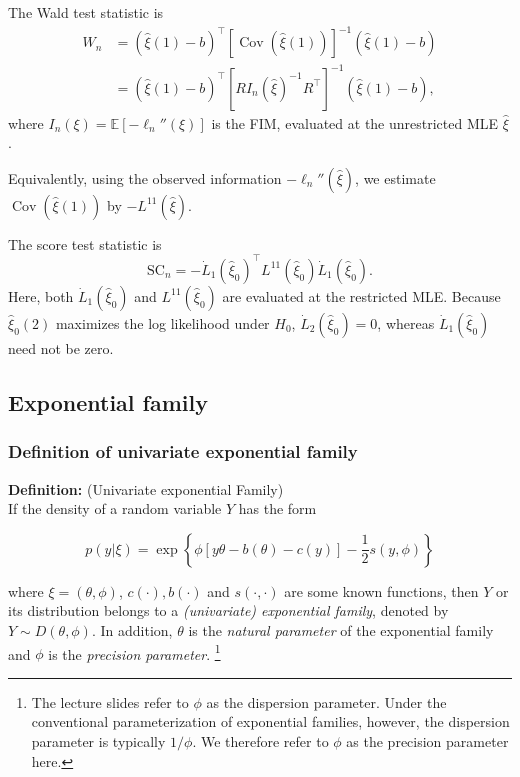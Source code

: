 \documentclass{article}
\newenvironment{mybox}{%
  \par\addvspace{10pt}%
  \begin{mdframed}[skipabove=0pt,skipbelow=10pt]%
}{%
  \end{mdframed}%
}
\theoremstyle{break}
\newcommand{\E}{\ensuremath{\mathbb{E}}}
\DeclareMathOperator{\Cov}{Cov}
\begin{document}
The Wald test statistic is
\begin{align*}
  W_n &= (\hat{\xi}(1) - b)^\top [\Cov(\hat{\xi}(1))]^{-1} (\hat{\xi}(1) - b) \\
    &= (\hat{\xi}(1) - b)^\top [R I_n(\hat{\xi})^{-1} R^\top]^{-1} (\hat{\xi}(1) - b),
\end{align*}
where $I_n(\xi)=\E[-\ell_n''(\xi)]$ is the FIM, evaluated at the unrestricted MLE $\hat{\xi}$.

Equivalently, using the observed information $-\ell_n''(\hat{\xi})$, we estimate $\Cov(\hat{\xi}(1))$ by $-L^{11}(\hat{\xi})$.

The score test statistic is
\begin{equation*}
  \text{SC}_n = -\dot{L}_1(\hat{\xi}_0)^\top L^{11}(\hat{\xi}_0) \dot{L}_1(\hat{\xi}_0).
\end{equation*}
Here, both $\dot{L}_1(\hat{\xi}_0)$ and $L^{11}(\hat{\xi}_0)$ are evaluated at the restricted MLE. Because $\hat{\xi}_0(2)$ maximizes the log likelihood under $H_0$, $\dot{L}_2(\hat{\xi}_0)=0$, whereas $\dot{L}_1(\hat{\xi}_0)$ need not be zero.


\subsection{Exponential family}\label{sec:prelim-glm-exp-family}
\subsubsection{Definition of univariate exponential family}
\textbf{Definition:} (Univariate exponential Family) \\
If the density of a random variable $Y$ 
has the form
\begin{mybox}
\begin{equation}\label{eq:prelim-glm-exp-family-form}
  p(y | \xi) = \exp 
  \left\{
    \phi[y\theta - b(\theta) - c(y)] - \frac{1}{2} s(y, \phi)
  \right\}
\end{equation}
\end{mybox}
where $\xi = (\theta, \phi)$, $c(\cdot), b(\cdot)$ and $s(\cdot,\cdot)$ are some known functions, then $Y$ or its distribution belongs to a \emph{(univariate) exponential family}, denoted by $Y \sim D(\theta, \phi)$. In addition, $\theta$ is the \emph{natural parameter} of the exponential family and $\phi$ is the \emph{precision parameter}.
\footnote{The lecture slides refer to $\phi$ as the dispersion parameter. Under the conventional parameterization of exponential families, however, the dispersion parameter is typically $1/\phi$. We therefore refer to $\phi$ as the precision parameter here.}
\end{document}
